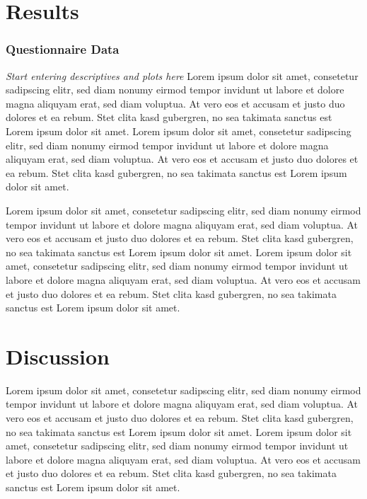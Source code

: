\documentclass[
  english,
  man,floatsintext]{apa6}
\begin{document}
\hypertarget{results}{%
\section{Results}\label{results}}

\hypertarget{questionnaire-data-1}{%
\subsubsection{Questionnaire Data}\label{questionnaire-data-1}}

\emph{Start entering descriptives and plots here} Lorem ipsum dolor sit amet, consetetur sadipscing elitr, sed diam nonumy eirmod tempor invidunt ut labore et dolore magna aliquyam erat, sed diam voluptua. At vero eos et accusam et justo duo dolores et ea rebum. Stet clita kasd gubergren, no sea takimata sanctus est Lorem ipsum dolor sit amet. Lorem ipsum dolor sit amet, consetetur sadipscing elitr, sed diam nonumy eirmod tempor invidunt ut labore et dolore magna aliquyam erat, sed diam voluptua. At vero eos et accusam et justo duo dolores et ea rebum. Stet clita kasd gubergren, no sea takimata sanctus est Lorem ipsum dolor sit amet.

Lorem ipsum dolor sit amet, consetetur sadipscing elitr, sed diam nonumy eirmod tempor invidunt ut labore et dolore magna aliquyam erat, sed diam voluptua. At vero eos et accusam et justo duo dolores et ea rebum. Stet clita kasd gubergren, no sea takimata sanctus est Lorem ipsum dolor sit amet. Lorem ipsum dolor sit amet, consetetur sadipscing elitr, sed diam nonumy eirmod tempor invidunt ut labore et dolore magna aliquyam erat, sed diam voluptua. At vero eos et accusam et justo duo dolores et ea rebum. Stet clita kasd gubergren, no sea takimata sanctus est Lorem ipsum dolor sit amet.

\hypertarget{discussion}{%
\section{Discussion}\label{discussion}}

Lorem ipsum dolor sit amet, consetetur sadipscing elitr, sed diam nonumy eirmod tempor invidunt ut labore et dolore magna aliquyam erat, sed diam voluptua. At vero eos et accusam et justo duo dolores et ea rebum. Stet clita kasd gubergren, no sea takimata sanctus est Lorem ipsum dolor sit amet. Lorem ipsum dolor sit amet, consetetur sadipscing elitr, sed diam nonumy eirmod tempor invidunt ut labore et dolore magna aliquyam erat, sed diam voluptua. At vero eos et accusam et justo duo dolores et ea rebum. Stet clita kasd gubergren, no sea takimata sanctus est Lorem ipsum dolor sit amet.
\end{document}
